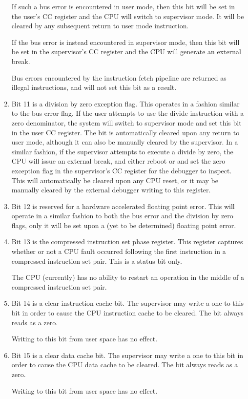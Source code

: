 \documentclass{gqtekspec}
\begin{document}
\begin{enumerate}
	If such a bus error is encountered in user mode, then this bit will be
	set in the user's CC register and the CPU will switch to supervisor
	mode.  It will be cleared by any subsequent return to user mode
	instruction.

	If the bus error is instead encountered in supervisor mode, then this
	bit will be set in the supervisor's CC register and the CPU will
	generate an external break.

	Bus errors encountered by the instruction fetch pipeline are returned
	as illegal instructions, and will not set this bit as a result.

\item Bit 11 is a division by zero exception flag.  This operates
	in a fashion similar to the bus error flag.  If the user attempts
	to use the divide instruction with a zero denominator, the system
	will switch to supervisor mode and set this bit in the user CC
	register.  The bit is automatically cleared upon any return to user
	mode, although it can also be manually cleared by the supervisor.  In
	a similar fashion, if the supervisor attempts to execute a divide by
	zero, the CPU will issue an external break, and either reboot or
	and set the zero exception flag in the supervisor's CC register
	for the debugger to inspect.  This will automatically be cleared
	upon any CPU reset, or it may be manually cleared by the external
	debugger writing to this register.

\item Bit 12 is reserved for a hardware accelerated floating point error.
	This will operate in a similar fashion to both the bus error and
	the division by zero flags, only it will be set upon a (yet to
	be determined) floating point error.

\item Bit 13 is the compressed instruction set phase register.  This
	register captures whether or not a CPU fault occurred following the
	first instruction in a compressed instruction set pair.  This is a
	status bit only.

	The CPU (currently) has no ability to restart an operation in the
	middle of a compressed instruction set pair.

\item Bit 14 is a clear instruction cache bit.  The supervisor may write a one
	to this bit in order to cause the CPU instruction cache to be cleared.
	The bit always reads as a zero.

	Writing to this bit from user space has no effect.

\item Bit 15 is a clear data cache bit.  The supervisor may write a one
	to this bit in order to cause the CPU data cache to be cleared.
	The bit always reads as a zero.

	Writing to this bit from user space has no effect.
\end{enumerate}
\end{document}
